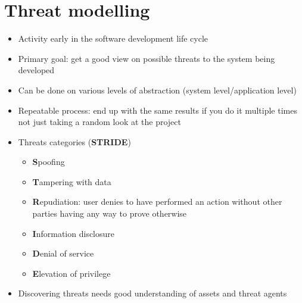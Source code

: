 \documentclass[12pt,titlepage,a4paper]{report}
\begin{document}
	\section{Threat modelling}
	\begin{itemize}
		\item Activity early in the software development life cycle
		\item Primary goal: get a good view on possible threats to the system being developed
		\item Can be done on various levels of abstraction (system level/application level)
		\item Repeatable process: end up with the same results if you do it multiple times
			\subitem not just taking a random look at the project
	\end{itemize}
	\begin{itemize}
		\item Threats categories (\textbf{STRIDE})
		\begin{itemize}
			\item \textbf{S}poofing
			\item \textbf{T}ampering with data
			\item \textbf{R}epudiation{\scriptsize: user denies to have performed an action without other parties having any way to prove otherwise}
			\item \textbf{I}nformation disclosure
			\item \textbf{D}enial of service
			\item \textbf{E}levation of privilege
		\end{itemize}
		\item Discovering threats needs good understanding of assets and threat agents
	\end{itemize}
\end{document}
